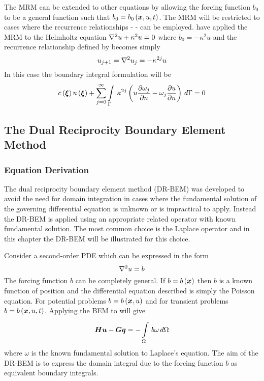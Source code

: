 The MRM can be extended to other equations by allowing the forcing function
$b_{0}$ to be a general function such that $b_{0} = \fnof{b_{0}}{\vect{x},u,t}$.
The MRM will be restricted to cases where the recurrence relationships -
 - can be employed.  
have applied the MRM to the Helmholtz equation $\laplacian{}{u} + \kappa^{2} u =
0$ where $b_{0} = -\kappa^{2} u$ and the recurrence relationship defined by
 becomes simply 
\begin{equation}
  u_{j+1} = \laplacian{}{u_{j}} = - \kappa^{2j} u
\end{equation}
In this case the boundary integral formulation will be
\begin{equation}
  \fnof{c}{\vect{\xi}} \fnof{u}{\vect{\xi}} + \dsuml{j=0}{\infty}
  \goneint{\kappa^{2j} \pbrac{u \delby{\omega_{j}}{n} -
    \omega_{j} \delby{u}{n}}}{\Gamma} = 0
\end{equation}

\subsection{The Dual Reciprocity Boundary Element Method}

\subsubsection{Equation Derivation}

The dual reciprocity boundary element method (DR-BEM) was developed to
avoid the need for domain integration in cases where the fundamental
solution of the governing differential equation is unknown or is
impractical to apply.  Instead the DR-BEM is applied using an appropriate
related operator with known fundamental solution.  The most common choice
is the Laplace operator \cite{partridge:1992} and in this chapter the DR-BEM
will be illustrated for this choice.

Consider a second-order PDE which can be expressed in the form
\begin{equation}
  \laplacian{}{u} = b
\label{eq:drmbase}
\end{equation}
The forcing function $b$ can be completely general. If $b = \fnof{b}{\vect{x}}$
then $b$ is a known function of position and the differential equation
described is simply the Poisson equation. For potential problems $b =
\fnof{b}{\vect{x},u}$ and for transient problems $b = \fnof{b}{\vect{x},u,t}$.
Applying the BEM to  will give
\begin{equation}
  \matr{H} \vect{u} - \matr{G} \vect{q} = -\goneint{b \omega}{\Omega}
\end{equation}
where $\omega$ is the known fundamental solution to Laplace's equation.
The aim of the DR-BEM is to express the domain integral due to the forcing
function $b$ as equivalent boundary integrals.

